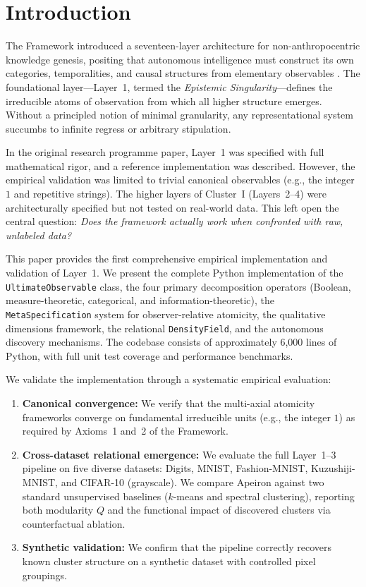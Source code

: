 \clearpage
\section{Introduction}
\label{sec:introduction}

The \Apeiron{} Framework introduced a seventeen-layer architecture for non-anthropocentric knowledge genesis, positing that autonomous intelligence must construct its own categories, temporalities, and causal structures from elementary observables \cite{beniers2026apeiron}. The foundational layer---Layer~1, termed the \emph{Epistemic Singularity}---defines the irreducible atoms of observation from which all higher structure emerges. Without a principled notion of minimal granularity, any representational system succumbs to infinite regress or arbitrary stipulation.

In the original research programme paper, Layer~1 was specified with full mathematical rigor, and a reference implementation was described. However, the empirical validation was limited to trivial canonical observables (e.g., the integer $1$ and repetitive strings). The higher layers of Cluster~I (Layers~2--4) were architecturally specified but not tested on real-world data. This left open the central question: \emph{Does the \Apeiron{} framework actually work when confronted with raw, unlabeled data?}

This paper provides the first comprehensive empirical implementation and validation of Layer~1. We present the complete Python implementation of the \texttt{UltimateObservable} class, the four primary decomposition operators (Boolean, measure-theoretic, categorical, and information-theoretic), the \texttt{MetaSpecification} system for observer-relative atomicity, the qualitative dimensions framework, the relational \texttt{DensityField}, and the autonomous discovery mechanisms. The codebase consists of approximately 6,000 lines of Python, with full unit test coverage and performance benchmarks.

We validate the implementation through a systematic empirical evaluation:

\begin{enumerate}
    \item \textbf{Canonical convergence:} We verify that the multi-axial atomicity frameworks converge on fundamental irreducible units (e.g., the integer $1$) as required by Axioms~1 and~2 of the \Apeiron{} Framework.
    
    \item \textbf{Cross-dataset relational emergence:} We evaluate the full Layer~1--3 pipeline on five diverse datasets: Digits, MNIST, Fashion-MNIST, Kuzushiji-MNIST, and CIFAR-10 (grayscale). We compare Apeiron against two standard unsupervised baselines ($k$-means and spectral clustering), reporting both modularity $Q$ and the functional impact of discovered clusters via counterfactual ablation.
    
    \item \textbf{Synthetic validation:} We confirm that the pipeline correctly recovers known cluster structure on a synthetic dataset with controlled pixel groupings.
\end{enumerate}

